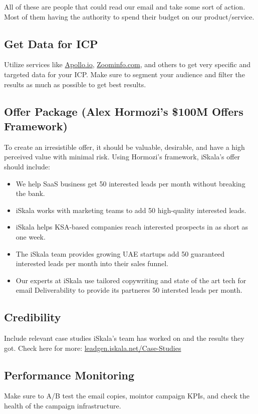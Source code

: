 \documentclass[12pt]{article}
\begin{document}
All of these are people that could read our email and take some sort of action. Most of them having the authority to spend their budget on our product/service.

\subsection{Get Data for ICP}
Utilize services like \url{Apollo.io}, \url{Zoominfo.com}, and others to get very specific and targeted data for your ICP. Make sure to segment your audience and filter the results as much as possible to get best results.

\subsection{Offer Package (Alex Hormozi's \$100M Offers Framework)}
To create an irresistible offer, it should be valuable, desirable, and have a high perceived value with minimal risk. Using Hormozi’s framework, iSkala’s offer should include: \par

\begin{itemize}
	\item We help SaaS business get 50 interested leads per month without breaking the bank.
	\item iSkala works with marketing teams to add 50 high-quality interested leads.
	\item iSkala helps KSA-based companies reach interested prospects in as short as one week.
	\item The iSkala team provides growing UAE startups add 50 guaranteed interested leads per month into their sales funnel.
	\item Our experts at iSkala use tailored copywriting and state of the art tech for email Deliverability to provide its partneres 50 intersted leads per month.
\end{itemize}

\subsection{Credibility}
Include relevant case studies iSkala's team has worked on and the results they got. Check here for more: \url{leadgen.iskala.net/Case-Studies}

\subsection{Performance Monitoring}
Make sure to A/B test the email copies, mointor campaign KPIs, and check the health of the campaign infrastructure.
\end{document}
